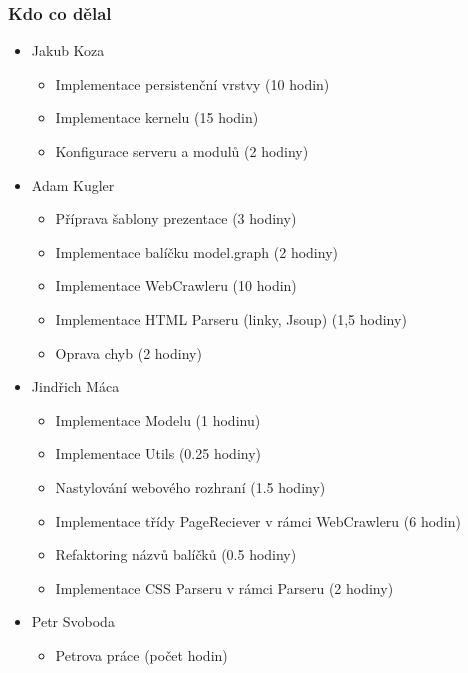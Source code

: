 \documentclass{beamer}
\begin{document}
\begin{frame}[allowframebreaks]\frametitle{Kdo co dělal} 
  \begin{itemize}
    \item Jakub Koza
      \begin{itemize}
       \item Implementace persistenční vrstvy (10 hodin)
       \item Implementace kernelu (15 hodin)
       \item Konfigurace serveru a modulů (2 hodiny)
     \end{itemize}    

    \item Adam Kugler
      \begin{itemize}
       \item Příprava šablony prezentace (3 hodiny)
       \item Implementace balíčku model.graph (2 hodiny)
       \item Implementace WebCrawleru (10 hodin)
       \item Implementace HTML Parseru (linky, Jsoup) (1,5 hodiny)
       \item Oprava chyb (2 hodiny)
     \end{itemize}

    \item Jindřich Máca
      \begin{itemize}
       \item Implementace Modelu (1 hodinu)
			 \item Implementace Utils (0.25 hodiny)
			 \item Nastylování webového rozhraní (1.5 hodiny)
			 \item Implementace třídy PageReciever v rámci WebCrawleru (6 hodin)
			 \item Refaktoring názvů balíčků (0.5 hodiny)
			 \item Implementace CSS Parseru v rámci Parseru (2 hodiny)
     \end{itemize}

    \item Petr Svoboda
      \begin{itemize}
       \item Petrova práce (počet hodin)
     \end{itemize}
   \end{itemize}  
\end{frame} 
\end{document}
